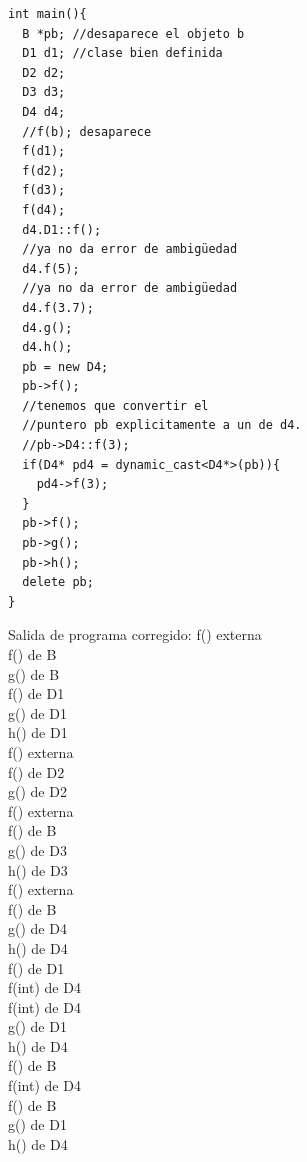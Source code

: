\begin{figure}[h]
  \begin{minipage}{0.4\textwidth}
    \begin{verbatim}
int main(){
  B *pb; //desaparece el objeto b
  D1 d1; //clase bien definida
  D2 d2;
  D3 d3;
  D4 d4;
  //f(b); desaparece
  f(d1); 
  f(d2);
  f(d3);
  f(d4); 
  d4.D1::f();
  //ya no da error de ambigüedad
  d4.f(5); 
  //ya no da error de ambigüedad
  d4.f(3.7); 
  d4.g();
  d4.h();
  pb = new D4;
  pb->f();
  //tenemos que convertir el 
  //puntero pb explicitamente a un de d4.
  //pb->D4::f(3); 
  if(D4* pd4 = dynamic_cast<D4*>(pb)){
    pd4->f(3);
  }
  pb->f();
  pb->g();
  pb->h();
  delete pb;
}
    \end{verbatim}
  \end{minipage}
\hfill
\begin{minipage}{0.5\textwidth}
  Salida de programa corregido:
  f() externa\\
  f() de B\\
  g() de B\\
  f() de D1\\
  g() de D1\\
  h() de D1\\
  f() externa\\
  f() de D2\\
  g() de D2\\
  f() externa\\
  f() de B\\
  g() de D3\\
  h() de D3\\
  f() externa\\
  f() de B\\
  g() de D4\\
  h() de D4\\
  f() de D1\\
  f(int) de D4\\
  f(int) de D4\\
  g() de D1\\
  h() de D4\\
  f() de B\\
  f(int) de D4\\
  f() de B\\
  g() de D1\\
  h() de D4
\end{minipage}
\end{figure}



